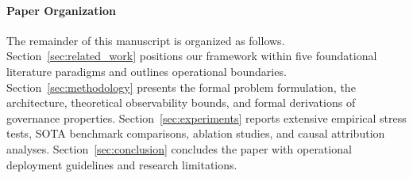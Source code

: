 \paragraph{Paper Organization}
The remainder of this manuscript is organized as follows. Section~\ref{sec:related_work} positions our framework within five foundational literature paradigms and outlines operational boundaries. Section~\ref{sec:methodology} presents the formal problem formulation, the \MethodName{} architecture, theoretical observability bounds, and formal derivations of governance properties. Section~\ref{sec:experiments} reports extensive empirical stress tests, SOTA benchmark comparisons, ablation studies, and causal attribution analyses. Section~\ref{sec:conclusion} concludes the paper with operational deployment guidelines and research limitations.
